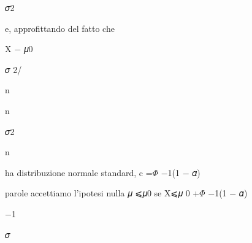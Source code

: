 \documentclass[a4paper,portrait,12pt]{article}
\begin{document}
\begin{flushleft}
𝜎2
\end{flushleft}





\begin{flushleft}
e, approfittando del fatto che
\end{flushleft}





\begin{flushleft}
X $-$ 𝜇0
\end{flushleft}


\begin{flushleft}
𝜎 2/
\end{flushleft}


\begin{flushleft}
n
\end{flushleft}





\begin{flushleft}
n
\end{flushleft}





\begin{flushleft}
𝜎2
\end{flushleft}





\begin{flushleft}
n
\end{flushleft}





\begin{flushleft}
ha distribuzione normale standard, c =$\Phi$ $-$1(1 $-$ 𝛼)
\end{flushleft}





\begin{flushleft}
parole accettiamo l'ipotesi nulla 𝜇 ⩽𝜇0 se X⩽𝜇 0 +$\Phi$ $-$1(1 $-$ 𝛼)
\end{flushleft}


$-$1





\begin{flushleft}
𝜎
\end{flushleft}
\end{document}
